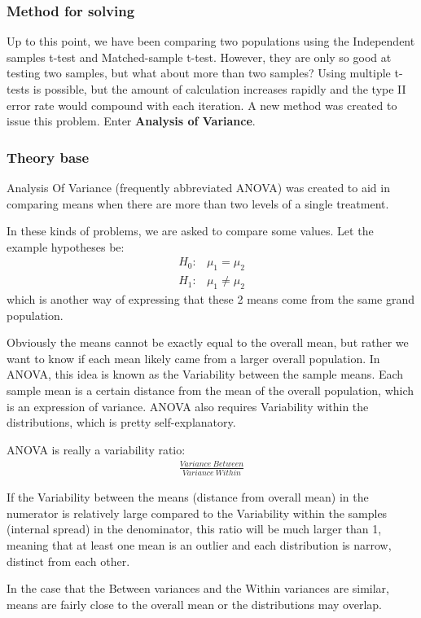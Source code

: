 \documentclass[a4paper]{article}
\numberwithin{equation}{section}
\begin{document}
\subsubsection{Method for solving}
Up to this point, we have been comparing two populations using the Independent samples t-test and Matched-sample t-test.
However, they are only so good at testing two samples, but what about more than two samples?
Using multiple t-tests is possible, but the amount of calculation increases rapidly and the type II error rate would compound with each iteration.
A new method was created to issue this problem.
Enter \textbf{Analysis of Variance}.

\subsubsection{Theory base}\label{anovaDef}
Analysis Of Variance (frequently abbreviated ANOVA) was created to aid in comparing means when there are more than two levels of a single treatment.

In these kinds of problems, we are asked to compare some values. Let the example hypotheses be:
\begin{align*}
  H_0: & \mu_1 = \mu_2    \\
  H_1: & \mu_1 \neq \mu_2
\end{align*}
which is another way of expressing that these 2 means come from the same grand population.

Obviously the means cannot be exactly equal to the overall mean, but rather we want to know if each mean likely came from a larger overall population.
In ANOVA, this idea is known as the Variability between the sample means.
Each sample mean is a certain distance from the mean of the overall population, which is an expression of variance.
ANOVA also requires Variability within the distributions, which is pretty self-explanatory.

ANOVA is really a variability ratio:
\begin{align*}
  \frac{Variance\ Between}{Variance\ Within}
\end{align*}

If the Variability between the means (distance from overall mean) in the numerator is relatively large compared to the Variability within the samples (internal spread) in the denominator, this ratio will be much larger than 1, meaning that at least one mean is an outlier and each distribution is narrow, distinct from each other.

In the case that the Between variances and the Within variances are similar, means are fairly close to the overall mean or the distributions may overlap.
\end{document}
